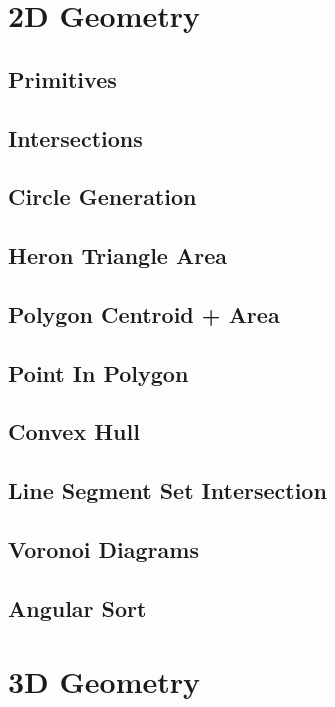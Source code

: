 \section{2D Geometry}
		\subsection{Primitives}
			
		\subsection{Intersections}
			
		\subsection{Circle Generation}
			
		\subsection{Heron Triangle Area}
			
		\subsection{Polygon Centroid + Area}
			
		\subsection{Point In Polygon}
			
		\subsection{Convex Hull}
			
		\subsection{Line Segment Set Intersection}
			
		\subsection{Voronoi Diagrams}
			
		\subsection{Angular Sort}
			
	\section{3D Geometry}
